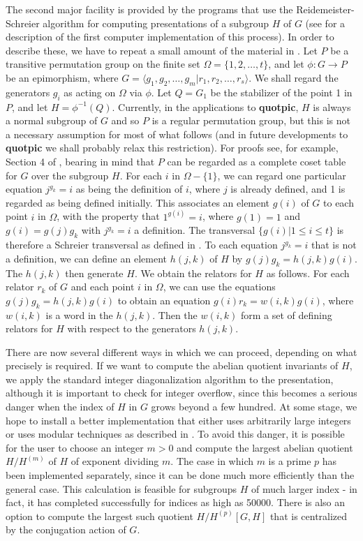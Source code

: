 The second major facility is provided by the programs that use the
Reide\-meister-Schreier algorithm for computing presentations of a subgroup $H$
of $G$ (see \cite{1} for a description of the first computer implementation
of this process).
In order to describe these, we have to repeat a small amount of the
material in \cite{7}.
Let $P$ be a transitive permutation group on
the finite set $\Omega = \{1,2, \ldots , t\}$,  and let
$\phi: G \longrightarrow P$ be an
epimorphism, where
$G = \langle g_1, g_2, \ldots , g_m | r_1, r_2, \ldots , r_s \rangle$.
We shall regard the generators $g_i$ as acting on $\Omega$
via $\phi$.  Let $Q = G_1$ be the stabilizer of
the point  1  in $P$,  and let $H = \phi^{-1}(Q)$.
Currently, in the applications to {\bf quotpic}, $H$ is always a normal
subgroup of $G$ and so $P$ is a regular permutation group, but this
is not a necessary assumption for most of what follows
(and in future developments to {\bf quotpic} we shall probably relax this
restriction).
For proofs see, for example, Section 4 of \cite{9},
bearing in mind that $P$ can be regarded as a complete coset table for
$G$ over the subgroup $H$.
For each $i$ in $\Omega - \{1\}$,  we can
regard one particular equation $j^{g_k} = i$ as being the definition of  $i$,
where $j$ is already defined,  and  1  is regarded as being defined initially.
This associates an element $g(i)$ of $G$  to each point
$i$ in $\Omega$, with the property that $1^{g(i)}=i$, where $g(1)=1$ and
$g(i)=g(j)g_k$ with $j^{g_k}=i$ a definition. The transversal
$\{ g(i) | 1 \leq i \leq t \}$ is therefore a Schreier transversal as defined
in \cite{9}.
To each equation  $j^{g_k} = i$ that is not a definition,
we can define an element $h(j,k)$ of $H$ by $g(j)g_k = h(j,k)g(i)$. The $h(j,k)$
then generate $H$.
We obtain the relators for $H$  as follows. For each relator $r_k$ of $G$ and
each point $i$ in $\Omega$, we can use the equations $g(j)g_k = h(j,k)g(i)$
to obtain an equation $g(i)r_k = w(i,k)g(i)$,  where $w(i,k)$ is a word in
the $h(j,k)$.  Then the $w(i,k)$ form a set of defining relators for $H$
with respect to the generators $h(j,k)$.

There are now several different ways in which we can proceed, depending on
what precisely is required. If we want to compute the
abelian quotient invariants of $H$, we apply
the standard integer diagonalization algorithm to the presentation, although it is important to
check for integer overflow, since this becomes a serious danger when the
index of $H$ in $G$ grows beyond a few hundred. At some stage, we hope to
install a better implementation that either uses arbitrarily large integers
or uses modular techniques as described in \cite{4}. To avoid this danger,
it is possible for the user to choose an integer $m > 0$ and compute the
largest abelian quotient $H/H^{(m)}$ of $H$ of exponent dividing $m$. The case
in which $m$ is a prime $p$ has been implemented separately, since it can be
done much more efficiently than the general case.
This calculation is feasible for subgroups $H$ of much larger index - in fact,
it has completed successfully for indices as high as 50000.
There is also an option to compute the largest such quotient $H/H^{(p)}[G,H]$
that is centralized by the conjugation action of $G$.

